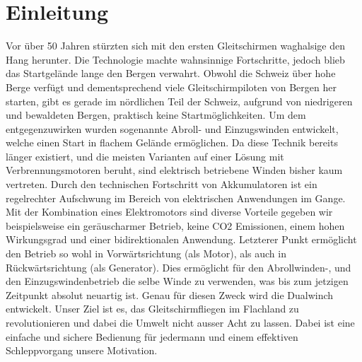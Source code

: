 \section{Einleitung}
Vor über 50 Jahren stürzten sich mit den ersten Gleitschirmen waghalsige den Hang herunter. Die Technologie machte wahnsinnige Fortschritte, jedoch blieb das Startgelände lange den Bergen verwahrt. Obwohl die Schweiz über hohe Berge verfügt und dementsprechend viele Gleitschirmpiloten von Bergen her starten, gibt es gerade im nördlichen Teil der Schweiz, aufgrund von niedrigeren und bewaldeten Bergen, praktisch keine Startmöglichkeiten. Um dem entgegenzuwirken wurden sogenannte Abroll- und Einzugswinden entwickelt, welche einen Start in flachem Gelände ermöglichen. Da diese Technik bereits länger existiert, und die meisten Varianten auf einer Lösung mit Verbrennungsmotoren beruht, sind elektrisch betriebene Winden bisher kaum vertreten. Durch den technischen Fortschritt von Akkumulatoren ist ein regelrechter Aufschwung im Bereich von elektrischen Anwendungen im Gange. Mit der Kombination eines Elektromotors sind diverse Vorteile gegeben wir beispielsweise ein geräuscharmer Betrieb, keine CO2 Emissionen, einem hohen Wirkungsgrad und einer bidirektionalen Anwendung. Letzterer Punkt ermöglicht den Betrieb so wohl in Vorwärtsrichtung (als Motor), als auch in Rückwärtsrichtung (als Generator). Dies ermöglicht für den Abrollwinden-, und den Einzugswindenbetrieb die selbe Winde zu verwenden, was bis zum jetzigen Zeitpunkt absolut neuartig ist. Genau für diesen Zweck wird die Dualwinch entwickelt. Unser Ziel ist es, das Gleitschirmfliegen im Flachland zu revolutionieren und dabei die Umwelt nicht ausser Acht zu lassen. Dabei ist eine einfache und sichere Bedienung für jedermann und einem effektiven Schleppvorgang unsere Motivation.


